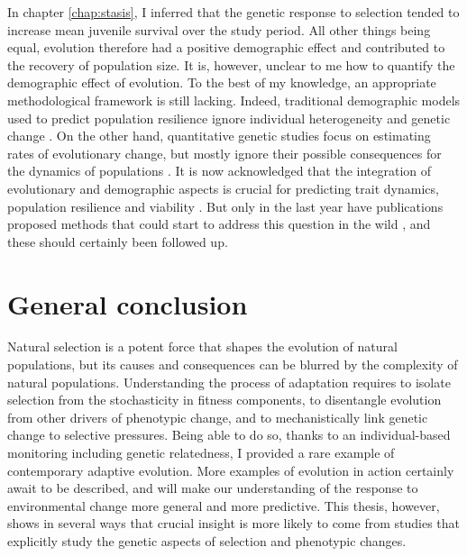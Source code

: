 In chapter \ref{chap:stasis}, I inferred that the genetic response to selection tended to increase mean juvenile survival over the study period. All other things being equal, evolution therefore had a positive demographic effect and contributed to the recovery of population size. It is, however, unclear to me how to quantify the demographic effect of evolution. To the best of my knowledge, an appropriate methodological framework is still lacking. 
Indeed, traditional demographic models used to predict population resilience ignore individual heterogeneity and genetic change \parencite{Kendall2011, vindenes2015, Plard2016}. On the other hand, quantitative genetic studies focus on estimating rates of evolutionary change, but mostly ignore their possible consequences for the dynamics of populations \parencite{Coulson2010,Chevin2012}.
It is now acknowledged that the integration of evolutionary and demographic aspects is crucial for predicting trait dynamics, population resilience and viability \parencite{Schoener2011,Pelletier2012,Chevin2012,Merila2014}. But only in the last year have publications proposed methods that could start to address this question in the wild \parencite{vindenes2015, Coulson2015, Childs2016}, and these should certainly been followed up. 

\section{General conclusion}
Natural selection is a potent force that shapes the evolution of natural populations, but its causes and consequences can be blurred by the complexity of natural populations.
Understanding the process of adaptation requires to isolate selection from the stochasticity in fitness components, to disentangle evolution from other drivers of phenotypic change, and to mechanistically link genetic change to selective pressures.
Being able to do so, thanks to an individual-based monitoring including genetic relatedness, I provided a rare example of contemporary adaptive evolution. More examples of evolution in action certainly await to be described, and will make our understanding of the response to environmental change more general and more predictive. This thesis, however, shows in several ways that crucial insight is more likely to come from studies that explicitly study the genetic aspects of selection and phenotypic changes.


